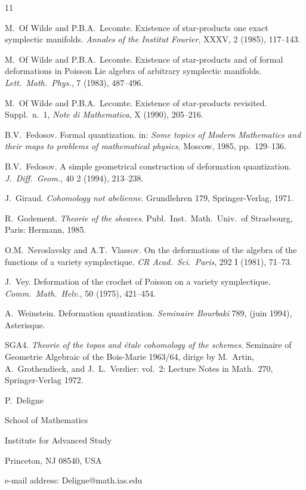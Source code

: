 \documentclass[11pt,a4paper]{article}
\theoremstyle{plain}
\theoremstyle{definition}
\begin{document}
\begin{thebibliography}{11}

M.~Of Wilde and P.B.A.~Lecomte. Existence of star-products one exact symplectic manifolds. \textit{Annales of the Institut Fourier}, XXXV, 2 (1985), 117--143.

M.~Of Wilde and P.B.A.~Lecomte. Existence of star-products and of formal deformations in Poisson Lie algebra of arbitrary symplectic manifolds. \textit{Lett.\ Math.\ Phys.}, 7 (1983), 487--496.

M.~Of Wilde and P.B.A.~Lecomte. Existence of star-products revisited. Suppl.\ n.~1, \textit{Note di Mathematica}, X (1990), 205--216.

B.V.~Fedosov. Formal quantization. in: \textit{Some topics of Modern Mathematics and their maps to problems of mathematical physics}, Moscow, 1985, pp.\ 129--136.

B.V.~Fedosov. A simple geometrical construction of deformation quantization. \textit{J.\ Diff.\ Geom.}, 40 2 (1994), 213--238.

J.~Giraud. \textit{Cohomology not abelienne}. Grundlehren 179, Springer-Verlag, 1971.

R.~Godement. \textit{Theorie of the sheaves}. Publ.\ Inst.\ Math.\ Univ.\ of Strasbourg, Paris: Hermann, 1985.

O.M.~Neroslavsky and A.T.~Vlassov. On the deformations of the algebra of the functions of a variety symplectique. \textit{CR Acad.\ Sci.\ Paris}, 292 I (1981), 71--73.

J.~Vey. Deformation of the crochet of Poisson on a variety symplectique. \textit{Comm.\ Math.\ Helv.}, 50 (1975), 421--454.

A.~Weinstein. Deformation quantization. \textit{Seminaire Bourbaki} 789, (juin 1994), Asterisque.

SGA4. \textit{Theorie of the topos and étale cohomology of the schemes}. Seminaire of Geometrie Algebraic of the Bois-Marie 1963/64, dirige by M.~Artin, A.~Grothendieck, and J.~L.~Verdier: vol.~2: Lecture Notes in Math.\ 270, Springer-Verlag 1972.

\end{thebibliography}

\vspace{1cm}
\noindent P.~Deligne

\noindent School of Mathematics

\noindent Institute for Advanced Study

\noindent Princeton, NJ 08540, USA

\noindent e-mail address: Deligne@math.ias.edu
\end{document}
